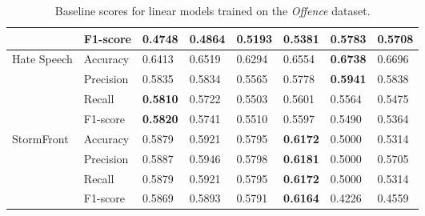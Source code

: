 \begin{table}[]
\begin{minipage}{0.42\paperheight}
{\begin{tabular}{ll|ll|ll|ll}
                                        & F1-score  & 0.4748      & 0.4864       & 0.5193 & 0.5381          & \bf{0.5783} & 0.5708      \\ \hline
      \multirow{4}{*}{Hate Speech}      & Accuracy  & 0.6413      & 0.6519       & 0.6294 & 0.6554          & \bf{0.6738} & 0.6696      \\
                                        & Precision & 0.5835      & 0.5834       & 0.5565 & 0.5778          & \bf{0.5941} & 0.5838      \\
                                        & Recall    & \bf{0.5810} & 0.5722       & 0.5503 & 0.5601          & 0.5564      & 0.5475      \\
                                        & F1-score  & \bf{0.5820} & 0.5741       & 0.5510 & 0.5597          & 0.5490      & 0.5364      \\ \hline
      \multirow{4}{*}{StormFront}       & Accuracy  & 0.5879      & 0.5921       & 0.5795 & \bf{0.6172}     & 0.5000      & 0.5314      \\
                                        & Precision & 0.5887      & 0.5946       & 0.5798 & \bf{0.6181}     & 0.5000      & 0.5705      \\
                                        & Recall    & 0.5879      & 0.5921       & 0.5795 & \bf{0.6172}     & 0.5000      & 0.5314      \\
                                        & F1-score  & 0.5869      & 0.5893       & 0.5791 & \bf{0.6164}     & 0.4226      & 0.4559
    \end{tabular}%
    }
    \caption{Baseline scores for linear models trained on the \textit{Offence} dataset.}
    \label{tab:linear_offence_baselines}
    \vfill
\end{minipage}
\end{table}
